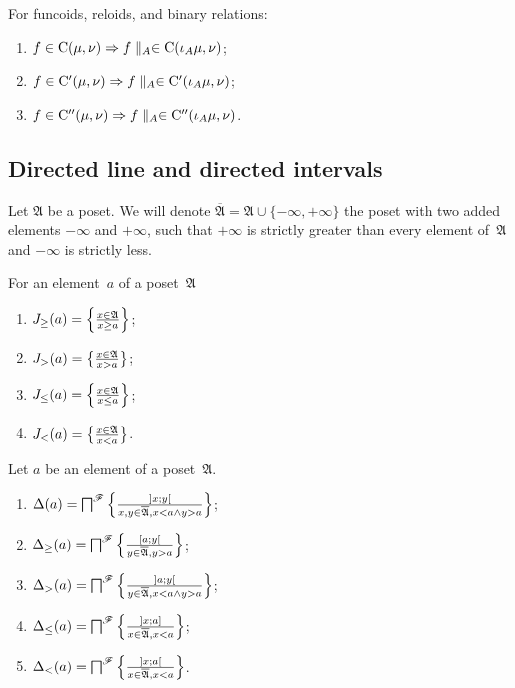 \begin{prop}
For funcoids, reloids, and binary relations:
\begin{enumerate}
\item $f\in\mathrm{C}(\mu,\nu)\Rightarrow f\parallel_{A}\in\mathrm{C}(\iota_A\mu,\nu)$;
\item $f\in\mathrm{C}'(\mu,\nu)\Rightarrow f\parallel_{A}\in\mathrm{C}'(\iota_A\mu,\nu)$;
\item $f\in\mathrm{C}''(\mu,\nu)\Rightarrow f\parallel_{A}\in\mathrm{C}''(\iota_A\mu,\nu)$. 
\end{enumerate}
\end{prop}

\subsection{Directed line and directed intervals}

Let $\mathfrak{A}$ be a poset. We will denote $\overline{\mathfrak{A}}=\mathfrak{A}\cup\{-\infty,+\infty\}$ the poset
with two added elements $-\infty$ and $+\infty$, such that $+\infty$ is strictly greater than every element of~$\mathfrak{A}$
and $-\infty$ is strictly less.

\begin{defn}
For an element~$a$ of a poset~$\mathfrak{A}$
\begin{enumerate}
\item $J_{\geq}(a) = \left\{ \frac{x\in\mathfrak{A}}{x\geq a}\right\}$;
\item $J_{>}(a) = \left\{ \frac{x\in\mathfrak{A}}{x>a}\right\}$;
\item $J_{\leq}(a) = \left\{ \frac{x\in\mathfrak{A}}{x\leq a}\right\}$;
\item $J_{<}(a) = \left\{ \frac{x\in\mathfrak{A}}{x<a}\right\}$.
\end{enumerate}
\end{defn}

\begin{defn}
Let $a$ be an element of a poset~$\mathfrak{A}$.
\begin{enumerate}
\item $\Delta(a) = \bigsqcap^{\mathscr{F}} \left\{ \frac{]x;y[}{x,y\in\overline{\mathfrak{A}}, x<a\land y>a}\right\}$;
\item $\Delta_{\geq}(a) = \bigsqcap^{\mathscr{F}} \left\{ \frac{[a;y[}{y\in\overline{\mathfrak{A}}, y>a}\right\}$;
\item $\Delta_{>}(a) = \bigsqcap^{\mathscr{F}} \left\{ \frac{]a;y[}{y\in\overline{\mathfrak{A}}, x<a\land y>a}\right\}$;
\item $\Delta_{\leq}(a) = \bigsqcap^{\mathscr{F}} \left\{ \frac{]x;a]}{x\in\overline{\mathfrak{A}}, x<a}\right\}$;
\item $\Delta_{<}(a) = \bigsqcap^{\mathscr{F}} \left\{ \frac{]x;a[}{x\in\overline{\mathfrak{A}}, x<a}\right\}$.
\end{enumerate}
\end{defn}

